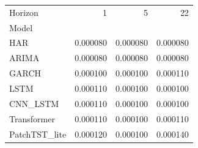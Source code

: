 \begin{tabular}{lrrr}
\toprule
Horizon & 1 & 5 & 22 \\
Model &  &  &  \\
\midrule
HAR & 0.000080 & 0.000080 & 0.000080 \\
ARIMA & 0.000080 & 0.000080 & 0.000080 \\
GARCH & 0.000100 & 0.000100 & 0.000110 \\
LSTM & 0.000110 & 0.000100 & 0.000100 \\
CNN_LSTM & 0.000110 & 0.000100 & 0.000100 \\
Transformer & 0.000110 & 0.000100 & 0.000110 \\
PatchTST_lite & 0.000120 & 0.000100 & 0.000140 \\
\bottomrule
\end{tabular}
